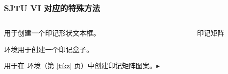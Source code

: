 \begin{frame}
  \frametitle{SJTU VI 对应的特殊方法}

  \begin{columns}
    \begin{column}{0.7\textwidth}

        用于创建一个印记形状文本框。

      \begin{stampbox}[sjtuRedPrimary]
         环境用于创建一个印记盒子。
      \end{stampbox}

       用于在  环境（第 \ref{tikz} 页）中创建印记矩阵图案。\textcolor{structure}{$\blacktriangleright$}
    \end{column}
    \begin{column}{0.3\textwidth}
      \begin{figure}
        \centering
        \caption{印记矩阵}
      \end{figure}
    \end{column}
  \end{columns}

\end{frame}


